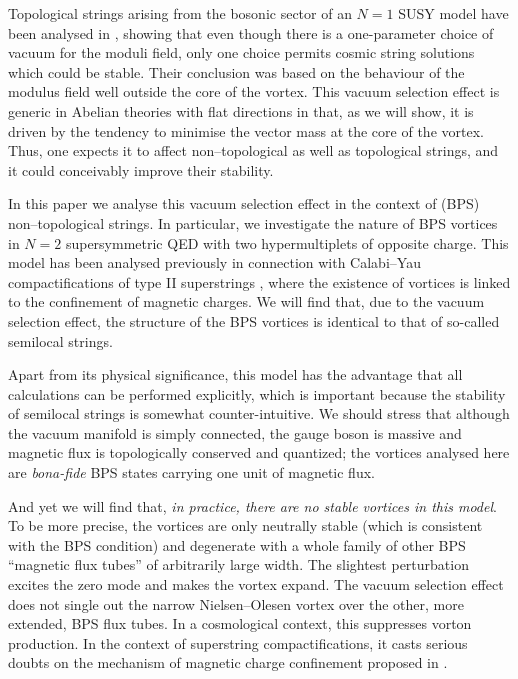 \documentclass[a4paper,aps,prd,superscriptaddress,floats]{revtex4}
\begin{document}
Topological strings arising from the bosonic sector of an $N\!=\!1$
 SUSY model have been analysed in \cite{PRTT96}, showing that even
 though there is a one-parameter choice of vacuum for the moduli
 field, only one choice permits cosmic string solutions which could be
 stable. Their conclusion was based on the behaviour of the modulus
 field well outside the core of the vortex. This vacuum selection
 effect is generic in Abelian theories with flat directions in that,
 as we will show, it is driven by the tendency to minimise the vector
 mass at the core of the vortex. Thus, one expects it to affect
 non--topological as well as topological strings, and  it could
 conceivably improve their stability.

In this paper we analyse this vacuum selection effect in the context
of (BPS) non--topological strings.  In particular, we investigate
the nature of BPS vortices in $N\!=\!2$ supersymmetric QED with two
hypermultiplets of opposite charge. This model has been analysed
previously in connection with Calabi--Yau compactifications of type II
superstrings \cite{GMV96}, where the existence of vortices is linked to the
confinement of magnetic charges. We will find that, due to the
vacuum selection effect, the structure of the BPS vortices is
identical to that of so-called semilocal strings\cite{VA91}.


Apart from its physical significance, this model has the 
advantage that all calculations can be performed explicitly, which is
important because the stability of semilocal strings is somewhat
counter-intuitive.  We should stress that although the vacuum manifold
is simply connected, the gauge boson is massive and magnetic flux is
topologically conserved and quantized; the vortices analysed here
are {\it bona-fide} BPS states carrying one unit of magnetic flux.

And yet we will find that, {\it in practice, there are no stable
vortices in this model}. To be more precise, the vortices are only
neutrally stable (which is consistent with the BPS condition) and
degenerate with a whole family of other BPS ``magnetic flux tubes'' of
arbitrarily large width. The slightest perturbation excites the zero
mode and makes the vortex expand.  The vacuum selection effect does
not single out the narrow Nielsen--Olesen vortex over the other, more
extended, BPS flux tubes.  In a cosmological context, this suppresses
vorton production. In the context of superstring compactifications, it
casts serious doubts on the mechanism of magnetic charge confinement
proposed in \cite{GMV96}.
\end{document}
